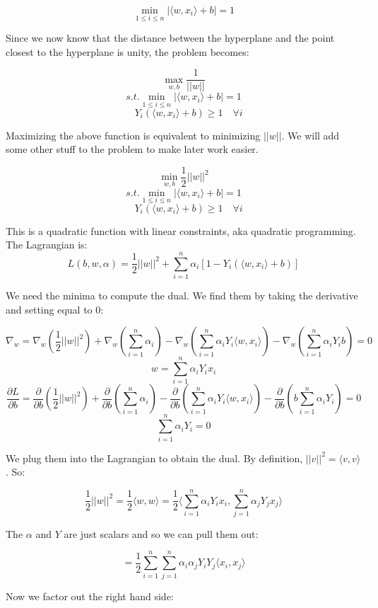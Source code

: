 \documentclass{minimal}
\begin{document}
$$
\min_{1 \leq i \leq n} |\langle w, x_i \rangle + b| = 1
$$

Since we now know that the distance between the hyperplane and the point closest
to the hyperplane is unity, the problem becomes: 

$$
\max_{w, b}\frac{1}{||w||}
$$
$$
s.t. \min_{1 \leq i \leq n} |\langle w, x_i \rangle + b| = 1
$$
$$
\quad Y_i(\langle w, x_i \rangle + b) \geq 1 \quad \forall i
$$

Maximizing the above function is equivalent to minimizing $||w||$. We will add
some other stuff to the problem to make later work easier.

$$
\min_{w, b}\frac{1}{2}||w||^2
$$
$$
s.t. \min_{1 \leq i \leq n} |\langle w, x_i \rangle + b| = 1
$$
$$
\quad Y_i(\langle w, x_i \rangle + b) \geq 1 \quad \forall i
$$


This is a quadratic function with linear constraints, aka quadratic programming.
The Lagrangian is:
$$
L(b, w, \alpha) = \frac{1}{2}||w||^2 + \sum_{i=1}^n \alpha_i [1 - Y_i(\langle
w, x_i \rangle + b)]
$$

We need the minima to compute the dual. We find them by taking the derivative
and setting equal to 0:

$$
\nabla_w = 
\nabla_w \left( \frac{1}{2}||w||^2 \right) + 
\nabla_w \left(\sum_{i=1}^n \alpha_i \right) - 
\nabla_w \left( \sum_{i=1}^n \alpha_i Y_i \langle w, x_i \rangle \right) - 
\nabla_w \left( \sum_{i=1}^n \alpha_i Y_i b \right)
= 0
$$
$$
w = \sum_{i=1}^n \alpha_i Y_i x_i
$$
$$
\frac{\partial L}{\partial b} = \frac{\partial}{\partial b}
\left( \frac{1}{2}||w||^2 \right) + \frac{\partial}{\partial b}
\left(\sum_{i=1}^n \alpha_i \right) - \frac{\partial}{\partial b}\left( \sum_{i=1}^n \alpha_i Y_i \langle
w, x_i \rangle \right) - \frac{\partial}{\partial b} \left( b \sum_{i=1}^n
\alpha_i Y_i \right)
=0
$$
$$
\sum_{i=1}^n \alpha_i Y_i = 0
$$

We plug them into the Lagrangian to obtain the dual. By
definition, $||v||^2 = \langle v, v \rangle$. So:

$$
\frac{1}{2} ||w||^2 = \frac{1}{2} \langle w, w \rangle = 
\frac{1}{2} \langle \sum_{i=1}^n \alpha_i Y_i x_i, \sum_{j=1}^n \alpha_j Y_j x_j \rangle
$$

The $\alpha$ and $Y$ are just scalars and so we can pull them out:

$$
= \frac{1}{2} \sum_{i=1}^n \sum_{j=1}^n \alpha_i \alpha_j Y_i Y_j \langle x_i, x_j \rangle
$$

Now we factor out the right hand side:
\end{document}
